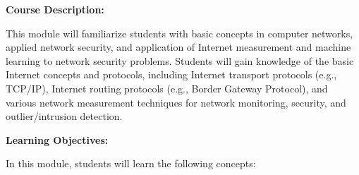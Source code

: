 \documentclass[12pt]{article}
\renewcommand{\_}{\kern-1.5pt\textunderscore\kern-1.5pt}
\begin{document}


\vspace{\baselineskip}

\vspace{\baselineskip}
\textbf{Course Description:}\par


\vspace{\baselineskip}
This module will familiarize students with basic concepts in computer networks, applied network security, and application of Internet measurement and machine learning to network security problems. Students will gain knowledge of the basic Internet concepts and protocols, including Internet transport protocols (e.g., TCP/IP), Internet routing protocols (e.g., Border Gateway Protocol), and various network measurement techniques for network monitoring, security, and outlier/intrusion detection. \par


\vspace{\baselineskip}
\textbf{Learning Objectives:}\par


\vspace{\baselineskip}
In this module, students will learn the following concepts:\par
\end{document}
